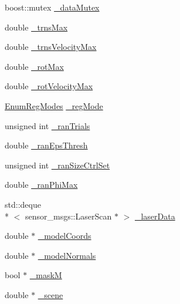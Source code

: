 \begin{DoxyCompactItemize}
\item 
boost\-::mutex \hyperlink{classohm__tsd__slam__ref_1_1ThreadLocalize_ad1b612e37ab54ffe1958cac7d5f9c89c}{\-\_\-data\-Mutex}
\item 
double \hyperlink{classohm__tsd__slam__ref_1_1ThreadLocalize_a943d9246b84ff11c2c01f7af1a3730f9}{\-\_\-trns\-Max}
\item 
double \hyperlink{classohm__tsd__slam__ref_1_1ThreadLocalize_a59316ea269ecac73e614061fa3f618df}{\-\_\-trns\-Velocity\-Max}
\item 
double \hyperlink{classohm__tsd__slam__ref_1_1ThreadLocalize_a4eec8ac0c4da6cc90fe5dcc22cee2447}{\-\_\-rot\-Max}
\item 
double \hyperlink{classohm__tsd__slam__ref_1_1ThreadLocalize_ab72a7278c4ce34dab852571b7c83705c}{\-\_\-rot\-Velocity\-Max}
\item 
\hyperlink{classohm__tsd__slam__ref_1_1ThreadLocalize_ac5ed59506607265dc4c38a64cf36156f}{Enum\-Reg\-Modes} \hyperlink{classohm__tsd__slam__ref_1_1ThreadLocalize_ace3a4195d80299e3eb37be6c3a06a218}{\-\_\-reg\-Mode}
\item 
unsigned int \hyperlink{classohm__tsd__slam__ref_1_1ThreadLocalize_a756d269b7f0782d3e789f29bfc7d838d}{\-\_\-ran\-Trials}
\item 
double \hyperlink{classohm__tsd__slam__ref_1_1ThreadLocalize_a2e9f4af9a78a5c16b1a4966b1e28a27b}{\-\_\-ran\-Eps\-Thresh}
\item 
unsigned int \hyperlink{classohm__tsd__slam__ref_1_1ThreadLocalize_a33d533907a160e94d357ecd3d8226f9b}{\-\_\-ran\-Size\-Ctrl\-Set}
\item 
double \hyperlink{classohm__tsd__slam__ref_1_1ThreadLocalize_a5ab8f03d41a726e561c95be6d6f090a7}{\-\_\-ran\-Phi\-Max}
\item 
std\-::deque\\*
$<$ sensor\-\_\-msgs\-::\-Laser\-Scan $\ast$ $>$ \hyperlink{classohm__tsd__slam__ref_1_1ThreadLocalize_ab4560c87e6163708f39d4cdfc2f8a074}{\-\_\-laser\-Data}
\item 
double $\ast$ \hyperlink{classohm__tsd__slam__ref_1_1ThreadLocalize_a3339b24a6b047266ceda1c160c79b1de}{\-\_\-model\-Coords}
\item 
double $\ast$ \hyperlink{classohm__tsd__slam__ref_1_1ThreadLocalize_ab787c1c72a9d4ac14e08c05519530e63}{\-\_\-model\-Normals}
\item 
bool $\ast$ \hyperlink{classohm__tsd__slam__ref_1_1ThreadLocalize_a00672731c254282c9e469636245b49ba}{\-\_\-mask\-M}
\item 
double $\ast$ \hyperlink{classohm__tsd__slam__ref_1_1ThreadLocalize_a44d298a710aa05043423e8894e8454a0}{\-\_\-scene}

\end{DoxyCompactItemize}
